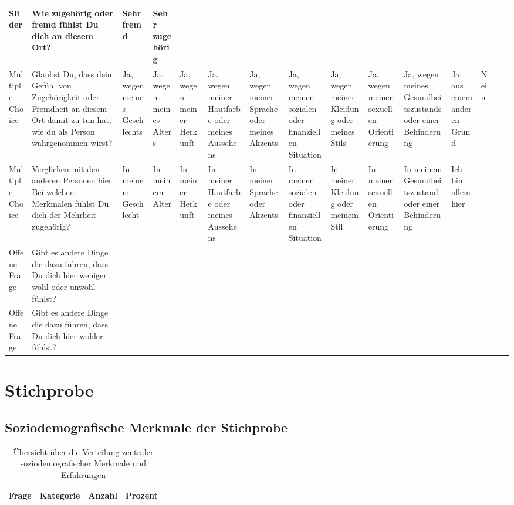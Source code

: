 \begin{appendices}
\begin{landscape}
\begin{longtable}{p{1.2cm} p{3.8cm} *{13}{p{1cm}}}
\midrule
Slider & Wie zugehörig oder fremd fühlst Du dich an diesem Ort? & Sehr fremd & Sehr zugehörig &  &  &  &  &  &  &  &  &  &  & \\
\midrule
Multiple-Choice & Glaubst Du, dass dein Gefühl von Zugehörigkeit oder Fremdheit an diesem Ort damit zu tun hat, wie du als Person wahrgenommen wirst? & Ja, wegen meines Geschlechts & Ja, wegen meines Alters & Ja, wegen meiner Herkunft & Ja, wegen meiner Hautfarbe oder meines Aussehens & Ja, wegen meiner Sprache oder meines Akzents & Ja, wegen meiner sozialen oder finanziellen Situation & Ja, wegen meiner Kleidung oder meines Stils & Ja, wegen meiner sexuellen Orientierung & Ja, wegen meines Gesundheitszustands oder einer Behinderung & Ja, aus einem anderen Grund & Nein &  & \\
\midrule
Multiple-Choice & Verglichen mit den anderen Personen hier: Bei welchen Merkmalen fühlst Du dich der Mehrheit zugehörig? & In meinem Geschlecht & In meinem Alter & In meiner Herkunft & In meiner Hautfarbe oder meines Aussehens & In meiner Sprache oder Akzents & In meiner sozialen oder finanziellen Situation & In meiner Kleidung oder meinem Stil & In meiner sexuellen Orientierung & In meinem Gesundheitszustand oder einer Behinderung & Ich bin allein hier &  &  & \\
\midrule
Offene Frage & Gibt es andere Dinge die dazu führen, dass Du dich hier weniger wohl oder unwohl fühlst? &  &  &  &  &  &  &  &  &  &  &  &  & \\
\midrule
Offene Frage & Gibt es andere Dinge die dazu führen, dass Du dich hier wohler fühlst? &  &  &  &  &  &  &  &  &  &  &  &  & \\
\bottomrule
\end{longtable}
\normalsize

    
\end{landscape}




\chapter{Stichprobe}
\section{Soziodemografische Merkmale der Stichprobe}
\label{app:appendix_demographics}
\footnotesize
\begin{longtable}{p{5.5cm}p{5.5cm}rr}
    \caption{Übersicht über die Verteilung zentraler soziodemografischer Merkmale und Erfahrungen}
    \label{tab:soziodemografie_gesamt}\\
    \toprule
    Frage & Kategorie & Anzahl & Prozent \\
    \midrule
    \endfirsthead


\end{longtable}
\end{appendices}
